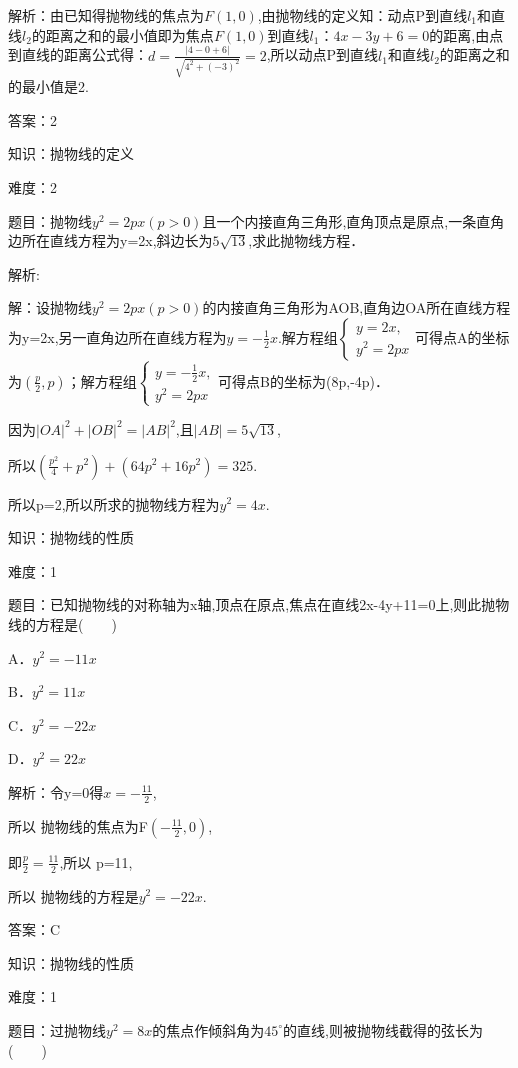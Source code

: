 \documentclass{article} %
\begin{document}
解析：由已知得抛物线的焦点为$F(1,0)$,由抛物线的定义知：动点P到直线$l_{1}$和直线$l_{2}$的距离之和的最小值即为焦点$F(1,0)$到直线$l_{1}：4x-3y+6=0$的距离,由点到直线的距离公式得：$d=\frac{|4-0+6|}{\sqrt{4^2+(-3)^2}}=2$,所以动点P到直线$l_{1}$和直线$l_{2}$的距离之和的最小值是2.

答案：2



知识：抛物线的定义

难度：2

题目：抛物线$y^{2}=2px(p>0)$且一个内接直角三角形,直角顶点是原点,一条直角边所在直线方程为y=2x,斜边长为$5\sqrt{13}$,求此抛物线方程．

解析:

解：设抛物线$y^{2}=2px(p>0)$的内接直角三角形为AOB,直角边OA所在直线方程为y=2x,另一直角边所在直线方程为$y=-\frac{1}{2}x$.解方程组$\left\{
\begin{array}{l}
y=2x, \\
y^2=2px
\end{array}
\right.$可得点A的坐标为$(\frac{p}{2},p)$；解方程组$\left\{
\begin{array}{l}
y=-\frac{1}{2}x, \\
y^2=2px
\end{array}
\right.$可得点B的坐标为(8p,-4p)．

因为$|OA|^2+|OB|^2=|AB|^2$,且$|AB|=5\sqrt{13}$,

所以$(\frac{p^2}{4}+p^2)+(64p^2+16p^2)=325$.

所以p=2,所以所求的抛物线方程为$y^{2}=4x$.



知识：抛物线的性质

难度：1

题目：已知抛物线的对称轴为x轴,顶点在原点,焦点在直线2x-4y+11=0上,则此抛物线的方程是(　　)

A．$y^{2}=-11x$   

B．$y^{2}=11x$

C．$y^{2}=-22x$   

D．$y^{2}=22x$

解析：令y=0得$x=-\frac{11}{2}$,

所以 抛物线的焦点为F$(-\frac{11}{2},0)$,

即$\frac{p}{2}=\frac{11}{2}$,所以 p=11,

所以 抛物线的方程是$y^{2}=-22x$.

答案：C

知识：抛物线的性质

难度：1

题目：过抛物线$y^{2}=8x$的焦点作倾斜角为$45^{\circ}$的直线,则被抛物线截得的弦长为(　　)
\end{document}
